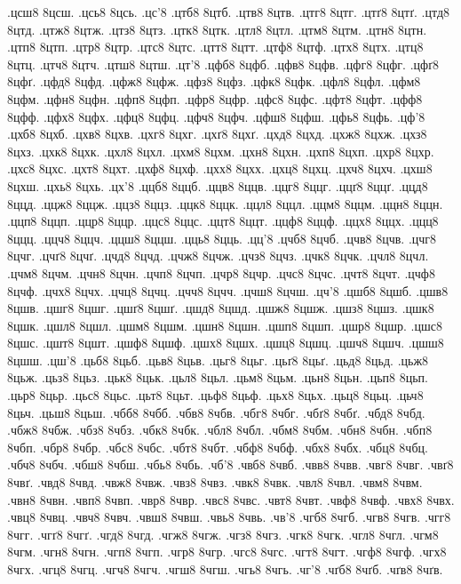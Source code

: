 {.цсш8 8цсш.
.цсь8 8цсь.
.цс'8
.цтб8 8цтб.
.цтв8 8цтв.
.цтг8 8цтг.
.цтґ8 8цтґ.
.цтд8 8цтд.
.цтж8 8цтж.
.цтз8 8цтз.
.цтк8 8цтк.
.цтл8 8цтл.
.цтм8 8цтм.
.цтн8 8цтн.
.цтп8 8цтп.
.цтр8 8цтр.
.цтс8 8цтс.
.цтт8 8цтт.
.цтф8 8цтф.
.цтх8 8цтх.
.цтц8 8цтц.
.цтч8 8цтч.
.цтш8 8цтш.
.цт'8
.цфб8 8цфб.
.цфв8 8цфв.
.цфг8 8цфг.
.цфґ8 8цфґ.
.цфд8 8цфд.
.цфж8 8цфж.
.цфз8 8цфз.
.цфк8 8цфк.
.цфл8 8цфл.
.цфм8 8цфм.
.цфн8 8цфн.
.цфп8 8цфп.
.цфр8 8цфр.
.цфс8 8цфс.
.цфт8 8цфт.
.цфф8 8цфф.
.цфх8 8цфх.
.цфц8 8цфц.
.цфч8 8цфч.
.цфш8 8цфш.
.цфь8 8цфь.
.цф'8
.цхб8 8цхб.
.цхв8 8цхв.
.цхг8 8цхг.
.цхґ8 8цхґ.
.цхд8 8цхд.
.цхж8 8цхж.
.цхз8 8цхз.
.цхк8 8цхк.
.цхл8 8цхл.
.цхм8 8цхм.
.цхн8 8цхн.
.цхп8 8цхп.
.цхр8 8цхр.
.цхс8 8цхс.
.цхт8 8цхт.
.цхф8 8цхф.
.цхх8 8цхх.
.цхц8 8цхц.
.цхч8 8цхч.
.цхш8 8цхш.
.цхь8 8цхь.
.цх'8
.ццб8 8ццб.
.ццв8 8ццв.
.ццг8 8ццг.
.ццґ8 8ццґ.
.ццд8 8ццд.
.ццж8 8ццж.
.ццз8 8ццз.
.ццк8 8ццк.
.ццл8 8ццл.
.ццм8 8ццм.
.ццн8 8ццн.
.ццп8 8ццп.
.ццр8 8ццр.
.ццс8 8ццс.
.ццт8 8ццт.
.ццф8 8ццф.
.ццх8 8ццх.
.ццц8 8ццц.
.ццч8 8ццч.
.ццш8 8ццш.
.цць8 8цць.
.цц'8
.цчб8 8цчб.
.цчв8 8цчв.
.цчг8 8цчг.
.цчґ8 8цчґ.
.цчд8 8цчд.
.цчж8 8цчж.
.цчз8 8цчз.
.цчк8 8цчк.
.цчл8 8цчл.
.цчм8 8цчм.
.цчн8 8цчн.
.цчп8 8цчп.
.цчр8 8цчр.
.цчс8 8цчс.
.цчт8 8цчт.
.цчф8 8цчф.
.цчх8 8цчх.
.цчц8 8цчц.
.цчч8 8цчч.
.цчш8 8цчш.
.цч'8
.цшб8 8цшб.
.цшв8 8цшв.
.цшг8 8цшг.
.цшґ8 8цшґ.
.цшд8 8цшд.
.цшж8 8цшж.
.цшз8 8цшз.
.цшк8 8цшк.
.цшл8 8цшл.
.цшм8 8цшм.
.цшн8 8цшн.
.цшп8 8цшп.
.цшр8 8цшр.
.цшс8 8цшс.
.цшт8 8цшт.
.цшф8 8цшф.
.цшх8 8цшх.
.цшц8 8цшц.
.цшч8 8цшч.
.цшш8 8цшш.
.цш'8
.цьб8 8цьб.
.цьв8 8цьв.
.цьг8 8цьг.
.цьґ8 8цьґ.
.цьд8 8цьд.
.цьж8 8цьж.
.цьз8 8цьз.
.цьк8 8цьк.
.цьл8 8цьл.
.цьм8 8цьм.
.цьн8 8цьн.
.цьп8 8цьп.
.цьр8 8цьр.
.цьс8 8цьс.
.цьт8 8цьт.
.цьф8 8цьф.
.цьх8 8цьх.
.цьц8 8цьц.
.цьч8 8цьч.
.цьш8 8цьш.
.чбб8 8чбб.
.чбв8 8чбв.
.чбг8 8чбг.
.чбґ8 8чбґ.
.чбд8 8чбд.
.чбж8 8чбж.
.чбз8 8чбз.
.чбк8 8чбк.
.чбл8 8чбл.
.чбм8 8чбм.
.чбн8 8чбн.
.чбп8 8чбп.
.чбр8 8чбр.
.чбс8 8чбс.
.чбт8 8чбт.
.чбф8 8чбф.
.чбх8 8чбх.
.чбц8 8чбц.
.чбч8 8чбч.
.чбш8 8чбш.
.чбь8 8чбь.
.чб'8
.чвб8 8чвб.
.чвв8 8чвв.
.чвг8 8чвг.
.чвґ8 8чвґ.
.чвд8 8чвд.
.чвж8 8чвж.
.чвз8 8чвз.
.чвк8 8чвк.
.чвл8 8чвл.
.чвм8 8чвм.
.чвн8 8чвн.
.чвп8 8чвп.
.чвр8 8чвр.
.чвс8 8чвс.
.чвт8 8чвт.
.чвф8 8чвф.
.чвх8 8чвх.
.чвц8 8чвц.
.чвч8 8чвч.
.чвш8 8чвш.
.чвь8 8чвь.
.чв'8
.чгб8 8чгб.
.чгв8 8чгв.
.чгг8 8чгг.
.чгґ8 8чгґ.
.чгд8 8чгд.
.чгж8 8чгж.
.чгз8 8чгз.
.чгк8 8чгк.
.чгл8 8чгл.
.чгм8 8чгм.
.чгн8 8чгн.
.чгп8 8чгп.
.чгр8 8чгр.
.чгс8 8чгс.
.чгт8 8чгт.
.чгф8 8чгф.
.чгх8 8чгх.
.чгц8 8чгц.
.чгч8 8чгч.
.чгш8 8чгш.
.чгь8 8чгь.
.чг'8
.чґб8 8чґб.
.чґв8 8чґв.
}
